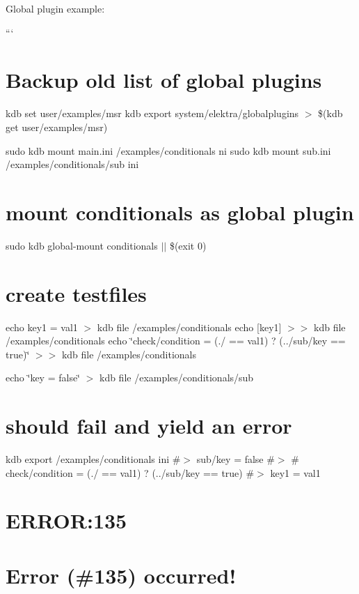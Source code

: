 Global plugin example\+:

``` \section*{Backup old list of global plugins}

kdb set user/examples/msr  kdb export system/elektra/globalplugins $>$ \$(kdb get user/examples/msr)

sudo kdb mount main.\+ini /examples/conditionals ni sudo kdb mount sub.\+ini /examples/conditionals/sub ini

\section*{mount conditionals as global plugin}

sudo kdb global-\/mount conditionals $\vert$$\vert$ \$(exit 0)

\section*{create testfiles}

echo \textquotesingle{}key1 = val1\textquotesingle{} $>$ {\ttfamily kdb file /examples/conditionals} echo \textquotesingle{}\mbox{[}key1\mbox{]}\textquotesingle{} $>$$>$ {\ttfamily kdb file /examples/conditionals} echo \char`\"{}check/condition = (./ == \textquotesingle{}val1\textquotesingle{}) ? (../sub/key == \textquotesingle{}true\textquotesingle{})\char`\"{} $>$$>$ {\ttfamily kdb file /examples/conditionals}

echo \char`\"{}key = false\char`\"{} $>$ {\ttfamily kdb file /examples/conditionals/sub}

\section*{should fail and yield an error}

kdb export /examples/conditionals ini \#$>$ sub/key = false \#$>$ \# check/condition = (./ == \textquotesingle{}val1\textquotesingle{}) ? (../sub/key == \textquotesingle{}true\textquotesingle{}) \#$>$ key1 = val1 \section*{E\+R\+R\+OR\+:135}

\section*{Error (\#135) occurred!}


